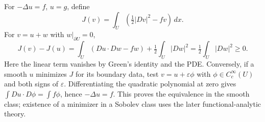 For $-\Delta u=f$, $u=g$, define
\[
 J(v)=\int_U\left(\tfrac12|Dv|^2-fv\right)\,dx.
\]
For $v=u+w$ with $w|_{\partial U}=0$,
\[
 J(v)-J(u)
 =\int_U(Du\cdot Dw-fw)+\tfrac12\int_U|Dw|^2
 =\tfrac12\int_U|Dw|^2\geq0.
\]
Here the linear term vanishes by Green's identity and the PDE.
Conversely, if a smooth $u$ minimizes $J$ for its boundary data, test
$v=u+\varepsilon\phi$ with $\phi\in C_c^\infty(U)$ and both signs of
$\varepsilon$. Differentiating the quadratic polynomial at zero gives
$\int Du\cdot D\phi=\int f\phi$, hence $-\Delta u=f$.
This proves the equivalence in the smooth class; existence of a minimizer
in a Sobolev class uses the later functional-analytic theory.
\Needspace{45mm}
